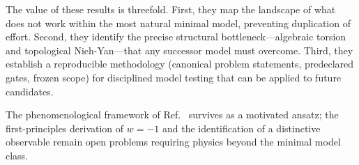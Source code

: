 \documentclass[11pt,letterpaper]{article}
\begin{document}
The value of these results is threefold. First, they map the landscape of
what does not work within the most natural minimal model, preventing
duplication of effort. Second, they identify the precise structural
bottleneck---algebraic torsion and topological Nieh-Yan---that any successor
model must overcome. Third, they establish a reproducible methodology
(canonical problem statements, predeclared gates, frozen scope) for
disciplined model testing that can be applied to future candidates.

The phenomenological framework of Ref.~\cite{Golden2026} survives as a
motivated ansatz; the first-principles derivation of $w=-1$ and the
identification of a distinctive observable remain open problems requiring
physics beyond the minimal model class.


\end{document}
